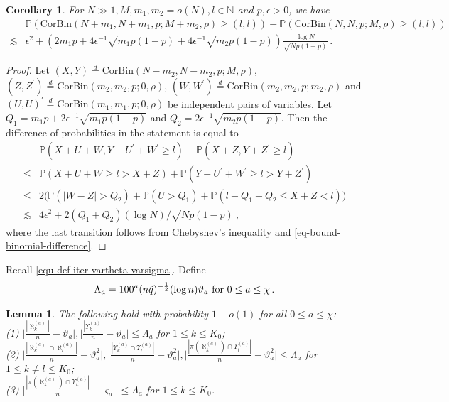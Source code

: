 \documentclass[11pt]{article}
\newtheorem{Lemma}[Theorem]{Lemma}
\newtheorem{Corollary}[Theorem]{Corollary}
\numberwithin{equation}{section}
\begin{document}
\begin{Corollary} \label{corollary-difference-CorBernoulli-tail-II}
For $N \gg 1,M,m_1,m_2 = o(N) ,l \in \mathbb{N}$ and $p,\epsilon > 0$, we have
\begin{align*}
    & \mathbb{P}( \mathrm{CorBin} (N+m_1,N+m_1,p;M+m_2,\rho) \geq (l,l) ) - \mathbb{P}( \mathrm{CorBin}(N,N,p;M,\rho) \geq (l,l) ) \\
    \lesssim & \epsilon^2 + ( 2m_1 p + 4 \epsilon^{-1} \sqrt{ m_1 p(1-p) } + 4 \epsilon^{-1} \sqrt{m_2 p(1-p)} ) \frac{\log N}{\sqrt{Np(1-p)}} \,.
\end{align*}
\end{Corollary}
\begin{proof}
Let $(X,Y) \overset{d}{=} \mathrm{CorBin} (N-m_2,N-m_2,p;M,\rho)$, $(Z,Z^{\prime}) \overset{d}{=} \mathrm{CorBin}(m_2,m_2,p;0,\rho)$, $(W,W^{\prime}) \overset{d}{=} \mathrm{CorBin}(m_2,m_2,p;m_2,\rho)$ and $(U,U)^{\prime} \overset{d}{=} \mathrm{CorBin}(m_1,m_1,p;0,\rho)$ be independent pairs of variables. Let $Q_1 = m_1 p + 2\epsilon^{-1} \sqrt{ m_1 p(1-p) } $ and $Q_2 = 2\epsilon^{-1} \sqrt{m_2 p(1-p)}$. Then the difference of probabilities in the statement  is  equal to
\begin{align*}
    & \mathbb{P}( X+U+W, Y+U^{\prime}+W^{\prime} \geq l) - \mathbb{P}( X+Z, Y+Z^{\prime} \geq l)  \\
    \leq & \mathbb{P}( X+U+W \geq l > X+Z ) + \mathbb{P}( Y+U^{\prime}+W^{\prime} \geq l > Y+Z^{\prime} ) \\
    \leq & 2 \big( \mathbb{P}( |W-Z| > Q_2 ) + \mathbb{P}(U > Q_1 ) + \mathbb{P}(  l-Q_1-Q_2 \leq X + Z < l ) \big) \\
    \lesssim & 4 \epsilon^2 + 2(Q_1+Q_2) (\log N) / \sqrt{Np(1-p)}    \,,
\end{align*}
where the last transition follows from Chebyshev's inequality and \eqref{eq-bound-binomial-difference}.
\end{proof}
Recall \eqref{equ-def-iter-vartheta-varsigma}. Define
    \begin{align}
        \Lambda_{a} = 100^{a} (n \Hat{q})^{-\frac{1}{2}} (\log n)  \vartheta_{a}  \mbox{ for } 0 \leq a \leq \chi   \,.
        \label{equ-def-Lambda}
    \end{align}
\begin{Lemma}
\label{lemma-concentration-iterative-aleph-Upsilon}
    The following hold with probability $1 - o(1)$ for all $0\leq a\leq \chi$: \\
        \noindent (1) $\Big| \frac{|\aleph^{(a)}_k|}{n} - \vartheta_{a} \Big|, \Big| \frac{|\Upsilon^{(a)}_k|}{n} - \vartheta_a \Big| \leq \Lambda_{a}$ for $1 \leq k \leq K_0$; \\
        \noindent (2) $\Big| \frac{|\aleph^{(a)}_k \cap \aleph^{(a)}_l|}{n} - \vartheta_a^2 \Big| , \Big| \frac{|\Upsilon^{(a)}_k \cap \Upsilon^{(a)}_l|}{n} - \vartheta_a^2 \Big|, \Big| \frac{|\pi(\aleph^{(a)}_k) \cap \Upsilon^{(a)}_l|}{n} - \vartheta_a^2 \Big| \leq \Lambda_{a} $ for $1 \leq k \neq l \leq K_0$; \\
        \noindent (3) $\Big| \frac{|\pi(\aleph^{(a)}_k) \cap \Upsilon^{(a)}_k|}{n} - \varsigma_{a} \Big| \leq \Lambda_{a} $ for $1 \leq k \leq K_0$.
\end{Lemma}
\end{document}
